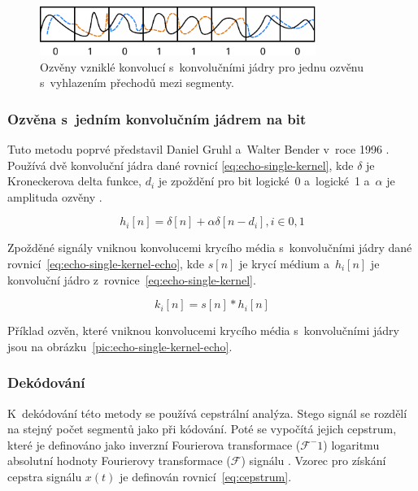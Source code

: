 \begin{figure}[hbt]
    \centering
    \includegraphics[width=0.8\textwidth]{obrazky/echo-smoothed.pdf}
    \caption{Ozvěny vzniklé konvolucí s~konvolučními jádry pro jednu ozvěnu
    s~vyhlazením přechodů mezi segmenty.}
    \label{pic:echo-single-kernel-echo-smooth}
\end{figure}

\subsubsection*{Ozvěna s~jedním konvolučním jádrem na bit}
\label{ssub:echo-single-kernel}

Tuto metodu poprvé představil Daniel Gruhl a~Walter Bender v~roce 1996
\cite{Gruhl1996}. Používá dvě konvoluční jádra dané rovnicí
\ref{eq:echo-single-kernel}, kde $\delta$ je Kroneckerova delta funkce, $d_i$
je zpoždění pro bit logické~0 a~logické~1 a~$\alpha$ je amplituda ozvěny
\cite{Dutta2020}.

\begin{equation}
    \label{eq:echo-single-kernel}
    h_i[n] = \delta[n] + \alpha\delta[n - d_i], i \in {0, 1}
\end{equation}

\noindent Zpožděné signály vniknou konvolucemi krycího média s~konvolučními
jádry dané rovnicí~\ref{eq:echo-single-kernel-echo}, kde $s[n]$ je krycí médium
a~$h_i[n]$ je konvoluční jádro z~rovnice~\ref{eq:echo-single-kernel}.

\begin{equation}
    \label{eq:echo-single-kernel-echo}
    k_i[n] = s[n] * h_i[n]
\end{equation}

\noindent Příklad ozvěn, které vniknou konvolucemi krycího média s~konvolučními
jádry jsou na obrázku~\ref{pic:echo-single-kernel-echo}.

\subsubsection*{Dekódování}
\label{ssub:echo-single-kernel-decoding}

K~dekódování této metody se používá cepstrální analýza. Stego signál se rozdělí
na stejný počet segmentů jako při kódování. Poté se vypočítá jejich cepstrum,
které je definováno jako inverzní Fourierova transformace ($\mathcal{F}^-1$)
logaritmu absolutní hodnoty Fourierovy transformace ($\mathcal{F}$) signálu
\cite{Tekeli2017}. Vzorec pro získání cepstra signálu $x(t)$ je definován
rovnicí~\ref{eq:cepstrum}.

